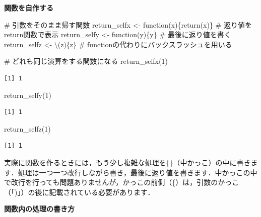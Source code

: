 \documentclass[
  letterpaper,
  DIV=11,
  numbers=noendperiod]{scrreprt}
\newenvironment{Shaded}{\begin{snugshade}}{\end{snugshade}}
\newcommand{\CommentTok}[1]{\textcolor[rgb]{0.37,0.37,0.37}{#1}}
\newcommand{\ControlFlowTok}[1]{\textcolor[rgb]{0.00,0.23,0.31}{#1}}
\newcommand{\DecValTok}[1]{\textcolor[rgb]{0.68,0.00,0.00}{#1}}
\newcommand{\FunctionTok}[1]{\textcolor[rgb]{0.28,0.35,0.67}{#1}}
\newcommand{\NormalTok}[1]{\textcolor[rgb]{0.00,0.23,0.31}{#1}}
\newcommand{\OtherTok}[1]{\textcolor[rgb]{0.00,0.23,0.31}{#1}}
\begin{document}
\textbf{関数を自作する}

\begin{Shaded}
\begin{Highlighting}[]
\CommentTok{\# 引数をそのまま帰す関数}
\NormalTok{return\_selfx }\OtherTok{\textless{}{-}} \ControlFlowTok{function}\NormalTok{(x)\{}\FunctionTok{return}\NormalTok{(x)\} }\CommentTok{\# 返り値をreturn関数で表示}
\NormalTok{return\_selfy }\OtherTok{\textless{}{-}} \ControlFlowTok{function}\NormalTok{(y)\{y\} }\CommentTok{\# 最後に返り値を書く}
\NormalTok{return\_selfz }\OtherTok{\textless{}{-}}\NormalTok{ \textbackslash{}(z)\{z\} }\CommentTok{\# functionの代わりにバックスラッシュを用いる}

\CommentTok{\# どれも同じ演算をする関数になる}
\FunctionTok{return\_selfx}\NormalTok{(}\DecValTok{1}\NormalTok{)}
\end{Highlighting}
\end{Shaded}

\begin{verbatim}
[1] 1
\end{verbatim}

\begin{Shaded}
\begin{Highlighting}[]
\FunctionTok{return\_selfy}\NormalTok{(}\DecValTok{1}\NormalTok{)}
\end{Highlighting}
\end{Shaded}

\begin{verbatim}
[1] 1
\end{verbatim}

\begin{Shaded}
\begin{Highlighting}[]
\FunctionTok{return\_selfz}\NormalTok{(}\DecValTok{1}\NormalTok{)}
\end{Highlighting}
\end{Shaded}

\begin{verbatim}
[1] 1
\end{verbatim}

実際に関数を作るときには，もう少し複雑な処理を\{\}（中かっこ）の中に書きます．処理は一つ一つ改行しながら書き，最後に返り値を書きます．中かっこの中で改行を行っても問題ありませんが，かっこの前側（\{）は，引数のかっこ（「)」）の後に記載されている必要があります．

\textbf{関数内の処理の書き方}
\end{document}
